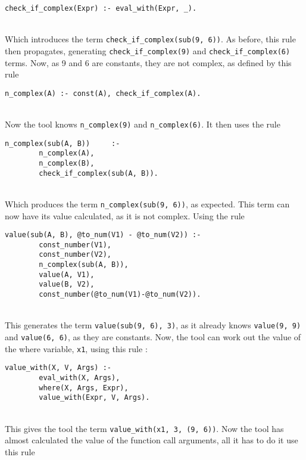 \begin{lstlisting}
check_if_complex(Expr) :- eval_with(Expr, _).
\end{lstlisting}
\mbox{} \\
Which introduces the term \lstinline{check_if_complex(sub(9, 6))}. As before, this rule then propagates, generating \lstinline{check_if_complex(9)} and \lstinline{check_if_complex(6)} terms. Now, as 9 and 6 are constants, they are not complex, as defined by this rule \\ %

\begin{lstlisting}
n_complex(A) :- const(A), check_if_complex(A).
\end{lstlisting}
\mbox{} \\
Now the tool knows \lstinline{n_complex(9)} and \lstinline{n_complex(6)}. It then uses the rule \\ %

\begin{lstlisting}
n_complex(sub(A, B))     :- 
		n_complex(A), 
		n_complex(B), 
		check_if_complex(sub(A, B)).
\end{lstlisting}
\mbox{} \\
Which produces the term \lstinline{n_complex(sub(9, 6))}, as expected. This term can now have its value calculated, as it is not complex. Using the rule \\ %

\begin{lstlisting}
value(sub(A, B), @to_num(V1) - @to_num(V2)) :- 
		const_number(V1), 
		const_number(V2), 
		n_complex(sub(A, B)), 
		value(A, V1), 
		value(B, V2), 
		const_number(@to_num(V1)-@to_num(V2)).
\end{lstlisting}
\mbox{} \\
This generates the term \lstinline{value(sub(9, 6), 3)}, as it already knows \lstinline{value(9, 9)} and \lstinline{value(6, 6)}, as they are constants. Now, the tool can work out the value of the where variable, \lstinline{x1}, using this rule : \\

\begin{lstlisting}
value_with(X, V, Args) :- 
		eval_with(X, Args), 
		where(X, Args, Expr), 
		value_with(Expr, V, Args).
\end{lstlisting}
\mbox{} \\
This gives the tool the term \lstinline{value_with(x1, 3, (9, 6))}. Now the tool has almost calculated the value of the function call arguments, all it has to do it use this rule \\%

